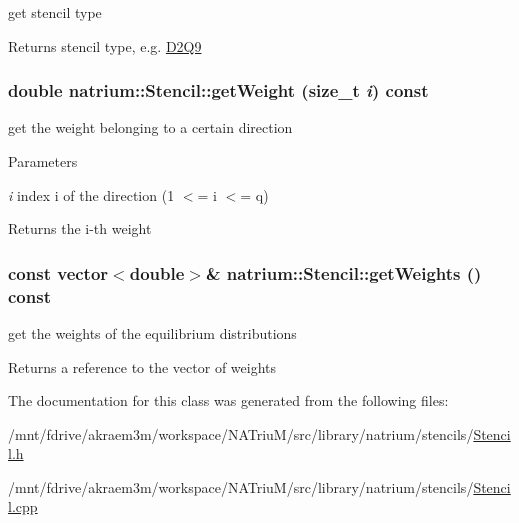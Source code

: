 get stencil type \begin{DoxyReturn}{Returns}
stencil type, e.g. \hyperlink{classnatrium_1_1D2Q9}{D2Q9} 
\end{DoxyReturn}
\hypertarget{classnatrium_1_1Stencil_ae5cb8bd1a305ed29c779725f489bb855}{
\subsubsection[{getWeight}]{\setlength{\rightskip}{0pt plus 5cm}double natrium::Stencil::getWeight (size\_\-t {\em i}) const}}
\label{classnatrium_1_1Stencil_ae5cb8bd1a305ed29c779725f489bb855}


get the weight belonging to a certain direction 
\begin{DoxyParams}{Parameters}
\item[{\em i}]index i of the direction (1 $<$= i $<$= q) \end{DoxyParams}
\begin{DoxyReturn}{Returns}
the i-\/th weight 
\end{DoxyReturn}
\hypertarget{classnatrium_1_1Stencil_a35c26427afdd33c3477b60be157e5bc8}{
\subsubsection[{getWeights}]{\setlength{\rightskip}{0pt plus 5cm}const vector$<$double$>$\& natrium::Stencil::getWeights () const}}
\label{classnatrium_1_1Stencil_a35c26427afdd33c3477b60be157e5bc8}


get the weights of the equilibrium distributions \begin{DoxyReturn}{Returns}
a reference to the vector of weights 
\end{DoxyReturn}


The documentation for this class was generated from the following files:\begin{DoxyCompactItemize}
\item 
/mnt/fdrive/akraem3m/workspace/NATriuM/src/library/natrium/stencils/\hyperlink{Stencil_8h}{Stencil.h}\item 
/mnt/fdrive/akraem3m/workspace/NATriuM/src/library/natrium/stencils/\hyperlink{Stencil_8cpp}{Stencil.cpp}\end{DoxyCompactItemize}
